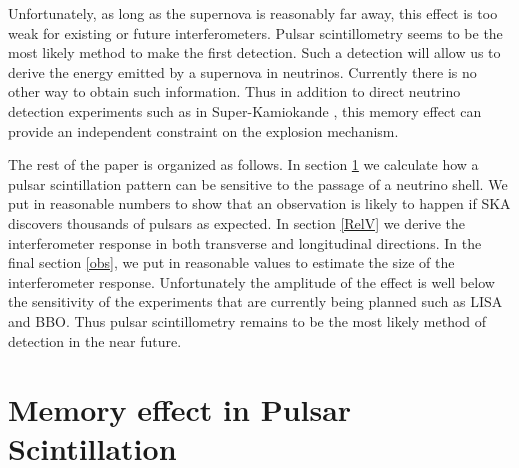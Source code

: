 \documentclass[aps,showpacs,onecolumn,floats,prd,superscriptaddress,nofootinbib]{revtex4-1}
\begin{document}
Unfortunately, as long as the supernova is reasonably far away, this effect is too weak for existing or future interferometers. 
Pulsar scintillometry seems to be the most likely method to make the first detection. 
Such a detection will allow us to derive the energy emitted by a supernova in neutrinos. 
Currently there is no other way to obtain such information. 
Thus in addition to direct neutrino detection experiments such as in Super-Kamiokande \cite{SuperKSN}, this memory effect can provide an independent constraint on the explosion mechanism.

The rest of the paper is organized as follows. 
In section \ref{sec-scint} we calculate how a pulsar scintillation pattern can be sensitive to the passage of a neutrino shell.
We put in reasonable numbers to show that an observation is likely to happen if SKA discovers thousands of pulsars as expected.
In section \ref{RelV} we derive the interferometer response in both transverse and longitudinal directions.  
In the final section \ref{obs}, we put in reasonable values to estimate the size of the interferometer response.
Unfortunately the amplitude of the effect is well below the sensitivity of the experiments that are currently being planned such as LISA and BBO.
Thus pulsar scintillometry remains to be the most likely method of detection in the near future.

\section{Memory effect in Pulsar Scintillation}
\label{sec-scint}
\end{document}

